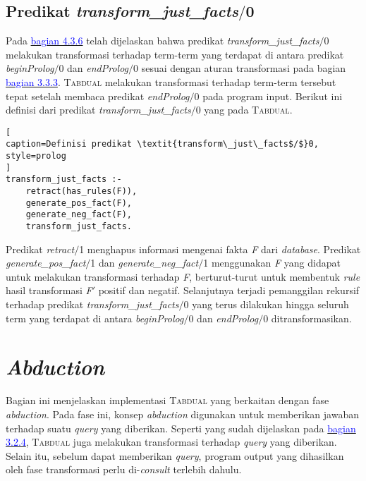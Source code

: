\subsection{Predikat \textit{transform\_just\_facts$/$}0}
\label{justfacts}

Pada \hyperref[justfacts2]{\textcolor{blue}{bagian 4.3.6}} telah dijelaskan bahwa predikat \textit{transform\_just\_facts$/$}0 melakukan transformasi terhadap term-term yang terdapat di antara predikat \textit{beginProlog$/$}0 dan \textit{endProlog$/$}0 sesuai dengan aturan transformasi pada bagian \hyperref[transfact]{\textcolor{blue}{bagian 3.3.3}}.  \textsc{Tabdual} melakukan transformasi terhadap term-term tersebut tepat setelah membaca predikat \textit{endProlog$/$}0 pada program input. Berikut ini definisi dari predikat \textit{transform\_just\_facts$/$}0 yang pada \textsc{Tabdual}.
\\

\begin{lstlisting}[
caption=Definisi predikat \textit{transform\_just\_facts$/$}0,
style=prolog
]
transform_just_facts :-
	retract(has_rules(F)),
	generate_pos_fact(F),
	generate_neg_fact(F),
	transform_just_facts.
\end{lstlisting}

Predikat \textit{retract$/$}1 menghapus informasi mengenai fakta \textit{F} dari \textit{database}. Predikat \textit{generate\_pos\_fact$/$}1 dan \textit{generate\_neg\_fact$/$}1 menggunakan \textit{F} yang didapat untuk melakukan transformasi terhadap \textit{F}, berturut-turut untuk membentuk \textit{rule} hasil transformasi \textit{F$'$} positif dan negatif. Selanjutnya terjadi pemanggilan rekursif terhadap predikat \textit{transform\_just\_facts$/$}0 yang terus dilakukan hingga seluruh term yang terdapat di antara \textit{beginProlog$/$}0 dan \textit{endProlog$/$}0 ditransformasikan.

\section{\textit{Abduction}}

Bagian ini menjelaskan implementasi \textsc{Tabdual} yang berkaitan dengan fase \textit{abduction}. Pada fase ini, konsep \textit{abduction} digunakan untuk memberikan jawaban terhadap suatu \textit{query} yang diberikan. Seperti yang sudah dijelaskan pada \hyperref[transquery]{\textcolor{blue}{bagian 3.2.4}}, \textsc{Tabdual} juga melakukan transformasi terhadap \textit{query} yang diberikan. Selain itu, sebelum dapat memberikan \textit{query}, program output yang dihasilkan oleh fase transformasi perlu di-\textit{consult} terlebih dahulu.

